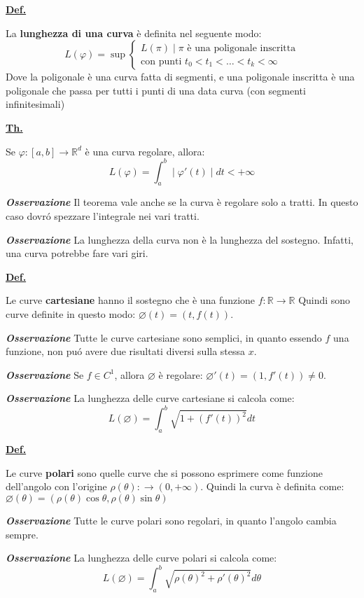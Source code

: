 \documentclass[a4paper,10pt]{article} %
\renewcommand{\b}[1]{%
    {\textbf{#1}}}
\newcommand{\ldef}[1]{%
    {\smallbreak\par\tiny\textbf{\underline{Def.}} {#1} \smallbreak}}
\newcommand{\ltheorem}[1]{%
    {\smallbreak\par\tiny\textbf{\underline{Th.}} {#1} \smallbreak\par}}
\newcommand{\loss}[1]{%
    {\smallbreak\par\tiny\emph{\textbf{Osservazione}} {#1} \par}}
\begin{document}
\begin{multicols}{6}
\ldef{
    La \b{lunghezza di una curva} è definita nel seguente modo:
    \[
        L(\varphi) = \sup 
        \begin{cases}
            L(\pi) \mid \pi \text{ è una poligonale inscritta} \\
            \text{con punti } t_0< t_1< \dots < t_k < \infty 
        \end{cases}
    \]
    Dove la poligonale è una curva fatta di segmenti, e una poligonale inscritta è una poligonale che passa per tutti i punti di una data curva (con segmenti infinitesimali)

}

\ltheorem{
    Se $\varphi \colon [a,b] \longrightarrow \mathbb{R}^d$ è una curva regolare, allora:
    \[
        L(\varphi) = \int_a^b \mid \varphi'(t) \mid dt < +\infty
    \]
    \loss{
        Il teorema vale anche se la curva è regolare solo a tratti.
        In questo caso dovr\'{o} spezzare l'integrale nei vari tratti.
    }
    \loss{
        La lunghezza della curva non è la lunghezza del sostegno.
        Infatti, una curva potrebbe fare vari giri.
    }
}


\ldef {
    Le curve \b{cartesiane} hanno il sostegno che è una funzione 
    $f \colon  \mathbb{R} \rightarrow \mathbb{R}$
    Quindi sono curve definite in questo modo: 
    $\varnothing(t) = (t, f(t))$.
    \loss{
        Tutte le curve cartesiane sono semplici, in quanto essendo $f$ una funzione,
        non pu\'{o} avere due risultati diversi sulla stessa $x$.
    }
    \loss{
        Se $f \in C^1$, allora $\varnothing$ è regolare: $\varnothing' (t) = (1, f'(t)) \neq 0$.
    }
    \loss{
        La lunghezza delle curve cartesiane si calcola come:
        \[
            L(\varnothing) = \int_a^b \sqrt{1 + (f'(t))^2} dt
        \]
    }
}

\ldef{
    Le curve \b{polari} sono quelle curve che si possono esprimere come 
    funzione dell'angolo con l'origine $\rho(\theta) \colon \rightarrow (0, +\infty)$.
    Quindi la curva è definita come:
    $\varnothing(\theta) = (\rho(\theta)\cos\theta, \rho(\theta)\sin\theta)$
    \loss{
        Tutte le curve polari sono regolari, in quanto l'angolo cambia sempre.
    }
    \loss{
        La lunghezza delle curve polari si calcola come:
        \[
            L(\varnothing) = \int_a^b \sqrt{\rho(\theta)^2 + \rho'(\theta)^2} d\theta
        \]
    }
 
}


\end{multicols}
\end{document}
